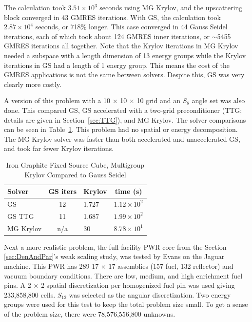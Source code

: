 The calculation took $3.51 \times 10^{3}$ seconds using MG Krylov, and the upscattering block converged in 43 GMRES iterations. With GS, the calculation took $2.87 \times 10^{4}$ seconds, or 718\% longer. This case converged in 44 Gauss Seidel iterations, each of which took about 124 GMRES inner iterations, or $\sim$5455 GMRES iterations all together. Note that the Krylov iterations in MG Krylov needed a subspace with a length dimension of 13 energy groups while the Krylov iterations in GS had a length of 1 energy group. This means the cost of the GMRES applications is not the same between solvers. Despite this, GS was very clearly more costly.

A version of this problem with a 10 $\times$ 10 $\times$ 10 grid and an $S_{8}$ angle set was also done. This compared GS, GS accelerated with a two-grid preconditioner (TTG; details are given in Section~\ref{sec:TTG}), and MG Krylov. The solver comparisons can be seen in Table~\ref{table:FeC GS Krylov}. This problem had no spatial or energy decomposition. The MG Krylov solver was faster than both accelerated and unaccelerated GS, and took far fewer Krylov iterations. 
%
\begin{table}[!h]
\caption{Iron Graphite Fixed Source Cube, Multigroup Krylov Compared to Gauss Seidel}
\begin{center}
\begin{tabular}{l c l c}
\hline
Solver & GS iters & Krylov & time (s)\\[0.5ex]
\hline
GS &  12 & 1,727 & $1.12 \times 10^{2}$ \\
GS TTG & 11 & 1,687 & $1.99 \times 10^{2}$  \\
MG Krylov & n/a & 30 & $8.78 \times 10^{1}$ \\
\hline
\end{tabular}
\end{center}
\label{table:FeC GS Krylov}
\end{table}

Next a more realistic problem, the full-facility PWR core from the Section \ref{sec:DenAndPar}'s weak scaling study, was tested by Evans on the Jaguar machine. This PWR has 289 17 $\times$ 17 assemblies (157 fuel, 132 reflector) and vacuum boundary conditions. There are low, medium, and high enrichment fuel pins. A 2 $\times$ 2 spatial discretization per homogenized fuel pin was used giving 233,858,800 cells. $S_{12}$ was selected as the angular discretization. Two energy groups were used for this test to keep the total problem size small. To get a sense of the problem size, there were 78,576,556,800 unknowns.

